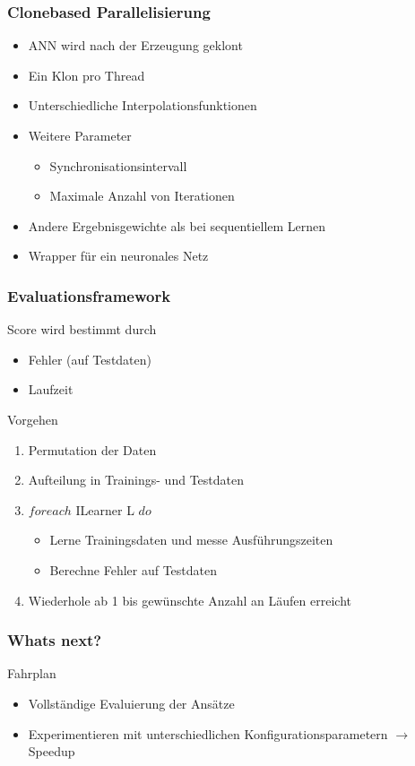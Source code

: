 \documentclass[18pt]{beamer}
\begin{document}
	\begin{frame}\frametitle{Clonebased Parallelisierung}
		\begin{itemize}
			\item ANN wird nach der Erzeugung \glqq geklont\grqq
			\item Ein Klon pro Thread
			\item Unterschiedliche Interpolationsfunktionen
			\item Weitere Parameter
			\begin{itemize}
				\item Synchronisationsintervall
				\item Maximale Anzahl von Iterationen
			\end{itemize}				
			\item Andere Ergebnisgewichte als bei sequentiellem Lernen
			\item Wrapper für ein neuronales Netz
		\end{itemize}
	\end{frame}





	\begin{frame}\frametitle{Evaluationsframework}
		\begin{block}{Score}
			wird bestimmt durch
		    \begin{itemize}
		    	\item Fehler (auf Testdaten)
		    	\item Laufzeit
		    \end{itemize}
		\end{block}
		\begin{block}{Vorgehen}
		    \begin{enumerate}
		    	\item Permutation der Daten
		    	\item Aufteilung in Trainings- und Testdaten
				\item $foreach$ ILearner L $do$
				\begin{itemize}
					\item Lerne Trainingsdaten und messe Ausführungszeiten
					\item Berechne Fehler auf Testdaten
				\end{itemize}
				\item Wiederhole ab 1 bis gewünschte Anzahl an Läufen erreicht
		    \end{enumerate}
		\end{block}
	\end{frame}

	\begin{frame}\frametitle{Whats next?}
		\begin{block}{Fahrplan}
		    \begin{itemize}
		    	\item Vollständige Evaluierung der Ansätze
		    	\item Experimentieren mit unterschiedlichen Konfigurationsparametern $\rightarrow$ Speedup
		    \end{itemize}
		\end{block}
	\end{frame}
\end{document}
